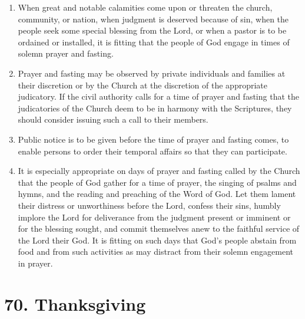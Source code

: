 \documentclass[
]{book}
\providecommand{\tightlist}{%
  \setlength{\itemsep}{0pt}\setlength{\parskip}{0pt}}
\begin{document}
\begin{enumerate}
\def\labelenumi{\arabic{enumi}.}
\tightlist
\item
  \protect\hypertarget{69}{\href{}{}}When great and notable calamities come upon or threaten the church, community, or nation, when judgment is deserved because of sin, when the people seek some special blessing from the Lord, or when a pastor is to be ordained or installed, it is fitting that the people of God engage in times of solemn prayer and fasting.
\item
  Prayer and fasting may be observed by private individuals and families at their discretion or by the Church at the discretion of the appropriate judicatory. If the civil authority calls for a time of prayer and fasting that the judicatories of the Church deem to be in harmony with the Scriptures, they should consider issuing such a call to their members.
\item
  Public notice is to be given before the time of prayer and fasting comes, to enable persons to order their temporal affairs so that they can participate.
\item
  It is especially appropriate on days of prayer and fasting called by the Church that the people of God gather for a time of prayer, the singing of psalms and hymns, and the reading and preaching of the Word of God. Let them lament their distress or unworthiness before the Lord, confess their sins, humbly implore the Lord for deliverance from the judgment present or imminent or for the blessing sought, and commit themselves anew to the faithful service of the Lord their God. It is fitting on such days that God's people abstain from food and from such activities as may distract from their solemn engagement in prayer.
\end{enumerate}

\hypertarget{thanksgiving}{%
\section*{70. Thanksgiving}\label{thanksgiving}}

\protect\hypertarget{chapter-slug-70-thanksgiving}{\href{}{}}
\end{document}
